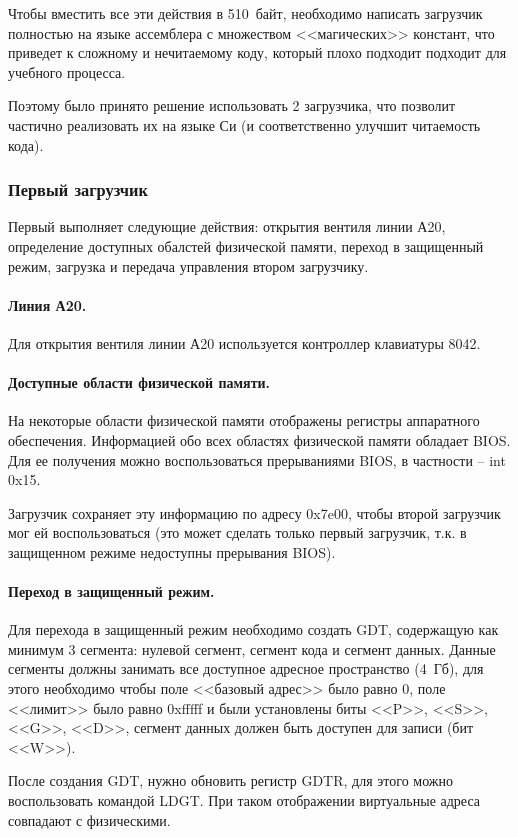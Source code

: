 Чтобы вместить все эти действия в 510~байт, необходимо написать загрузчик полностью
на языке ассемблера с множеством <<магических>> констант, что приведет к сложному и
нечитаемому коду, который плохо подходит подходит для учебного процесса.

Поэтому было принято решение использовать 2 загрузчика, что позволит частично реализовать
их на языке Си (и соответственно улучшит читаемость кода).

\subsubsection*{Первый загрузчик}
Первый выполняет следующие действия: открытия вентиля линии А20, определение доступных
обалстей физической памяти, переход в защищенный режим, загрузка и передача управления
втором загрузчику.

\paragraph{Линия А20.} Для открытия вентиля линии А20 используется контроллер клавиатуры 8042.

\paragraph{Доступные области физической памяти.} На некоторые области физической памяти
отображены регистры аппаратного обеспечения. Информацией обо всех областях физической памяти
обладает BIOS. Для ее получения можно воспользоваться прерываниями BIOS, в частности -- int 0x15.

Загрузчик сохраняет эту информацию по адресу 0x7e00, чтобы второй загрузчик мог ей воспользоваться
(это может сделать только первый загрузчик, т.к. в защищенном режиме недоступны прерывания BIOS).

\paragraph{Переход в защищенный режим.} Для перехода в защищенный режим необходимо создать GDT,
содержащую как минимум 3 сегмента: нулевой сегмент, сегмент кода и сегмент данных. Данные сегменты
должны занимать все доступное адресное пространство (4~Гб), для этого необходимо чтобы поле
<<базовый адрес>> было равно 0, поле <<лимит>> было равно 0xfffff и были установлены биты
<<P>>, <<S>>, <<G>>, <<D>>, сегмент данных должен быть доступен для записи (бит <<W>>).

После создания GDT, нужно обновить регистр GDTR, для этого можно воспользовать командой LDGT.
При таком отображении виртуальные адреса совпадают с физическими.

